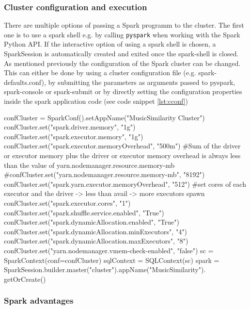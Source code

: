 \subsubsection{Cluster configuration and execution}\label{cconfexp}


There are multiple options of passing a Spark programm to the cluster. The first one is to use a spark shell e.g. by calling \lstinline{pyspark} when working with the Spark Python API. If the interactive option of using a spark shell is chosen, a SparkSession is automatically created and exited once the spark-shell is closed. 
As mentioned previously the configuration of the Spark cluster can be changed. This can either be done by using a cluster configuration file (e.g. spark-defaults.conf), by submitting the parameters as arguments passed to pyspark, spark-console or spark-submit or by directly setting the configuration properties inside the spark application code (see code snippet \ref{lst:cconf})\\


\begin{pythonCode}[frame=single,label={lst:cconf},caption={example cluster configuration python},captionpos=b]
confCluster = SparkConf().setAppName("MusicSimilarity Cluster")
confCluster.set("spark.driver.memory", "1g")
confCluster.set("spark.executor.memory", "1g")
confCluster.set("spark.executor.memoryOverhead", "500m")
#Sum of the driver or executor memory plus the driver or executor memory overhead is always less than the value of yarn.nodemanager.resource.memory-mb
#confCluster.set("yarn.nodemanager.resource.memory-mb", "8192")
confCluster.set("spark.yarn.executor.memoryOverhead", "512")
#set cores of each executor and the driver -> less than avail -> more executors spawn
confCluster.set("spark.executor.cores", "1")
confCluster.set("spark.shuffle.service.enabled", "True")
confCluster.set("spark.dynamicAllocation.enabled", "True")
confCluster.set("spark.dynamicAllocation.minExecutors", "4")
confCluster.set("spark.dynamicAllocation.maxExecutors", "8")
confCluster.set("yarn.nodemanager.vmem-check-enabled", "false")
sc = SparkContext(conf=confCluster)
sqlContext = SQLContext(sc)
spark = SparkSession.builder.master("cluster").appName("MusicSimilarity").
	getOrCreate()
\end{pythonCode}

\subsubsection{Spark advantages}

